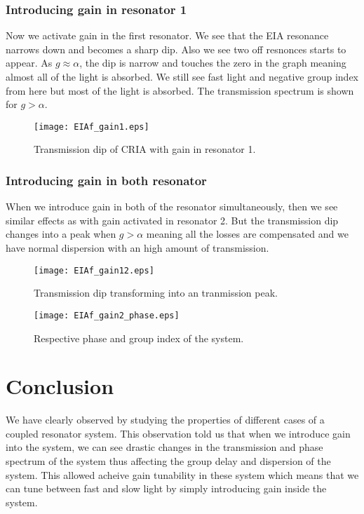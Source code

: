 \subsubsection{Introducing gain in resonator 1}
Now we activate gain in the first resonator. We see that the EIA resonance narrows down and becomes a sharp dip. Also we see two off resnonces starts to appear. As $g \approx \alpha$, the dip is narrow and touches the zero in the graph meaning almost all of the light is absorbed. We still see fast light and negative group index from here but most of the light is absorbed. The transmission spectrum is shown for $g > \alpha$.

\begin{figure}[h]
\centering
\texttt{[image: EIAf\_gain1.eps]}
\caption{Transmission dip of CRIA with gain in resonator 1.}
\end{figure}

\subsubsection{Introducing gain in both resonator}
When we introduce gain in both of the resonator simultaneously, then we see similar effects as with gain activated in resonator 2. But the transmission dip changes into a peak when $g > \alpha$ meaning all the losses are compensated and we have normal dispersion with an high amount of transmission.

\begin{figure}[h]
\centering
\texttt{[image: EIAf\_gain12.eps]}
\caption{Transmission dip transforming into an tranmission peak.}
\end{figure}

\begin{figure}[h]
\centering
\texttt{[image: EIAf\_gain2\_phase.eps]}
\caption{Respective phase and group index of the system.}
\end{figure}


\section{Conclusion}
We have clearly observed by studying the properties of different cases of a coupled resonator system. This observation told us that when we introduce gain into the system, we can see drastic changes in the transmission and phase spectrum of the system thus affecting the group delay and dispersion of the system. This allowed acheive gain tunability in these system which means that we can tune between fast and slow light by simply introducing gain inside the system.

